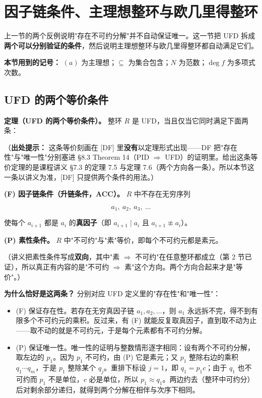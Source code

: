 \section{因子链条件、主理想整环与欧几里得整环}


上一节的两个反例说明"存在不可约分解"并不自动保证唯一。这一节把 UFD 拆成\textbf{两个可以分别验证的条件}，然后说明主理想整环与欧几里得整环都自动满足它们。

\textbf{本节用到的记号：} $(a)$ 为主理想；$\subseteq$ 为集合包含；$N$ 为范数；$\deg f$ 为多项式次数。

\subsection{UFD 的两个等价条件}


\textbf{定理（UFD 的两个等价条件）。} 整环 $R$ 是 UFD，当且仅当它同时满足下面两条：

（\textbf{出处提示：} 这条等价刻画在 [DF] 里\textbf{没有}以定理形式出现——DF 把"存在性"与"唯一性"分别塞进 §8.3 Theorem 14（PID $\Rightarrow$ UFD）的证明里。给出这条等价定理的是课程讲义 §7.3 的定理 7.5 与定理 7.6（两个方向各一条）。所以本节这一条以讲义为准，[DF] 只提供两个条件的用法。）

\textbf{(F) 因子链条件（升链条件，ACC）。} $R$ 中不存在无穷序列

\[
a_1,\ a_2,\ a_3,\ \dots
\]

使每个 $a_{i+1}$ 都是 $a_i$ 的\textbf{真因子}（即 $a_{i+1}\mid a_i$ 且 $a_{i+1}\not\approx a_i$）。

\textbf{(P) 素性条件。} $R$ 中"不可约"与"素"等价，即每个不可约元都是素元。

（讲义把素性条件写成\textbf{双向}，其中"素 $\Rightarrow$ 不可约"在任意整环都成立（第 2 节已证），所以真正有内容的是"不可约 $\Rightarrow$ 素"这个方向。两个方向合起来才是"等价"。）

\textbf{为什么恰好是这两条？} 分别对应 UFD 定义里的"存在性"和"唯一性"：

\begin{itemize}
\item (F) 保证存在性。若存在无穷真因子链 $a_1,a_2,\dots$，则 $a_1$ 永远拆不完，得不到有限多个不可约元的乘积。反过来，有 (F) 就能反复取真因子，直到取不动为止——取不动的就是不可约元，于是每个元素都有不可约分解。
\item (P) 保证唯一性。唯一性的证明与整数情形逐字相同：设有两个不可约分解，取左边的 $p_1$。因为 $p_1$ 不可约，由 (P) 它是素元；又 $p_1$ 整除右边的乘积 $q_1\cdots q_m$，于是 $p_1$ 整除某个 $q_j$。重排下标设 $j=1$，即 $q_1=p_1c$；由于 $q_1$ 也不可约而 $p_1$ 不是单位，$c$ 必是单位，所以 $p_1\approx q_1$。两边约去（整环中可约分）后对剩余部分递归，就得到两个分解在相伴与次序下相同。
\end{itemize}


